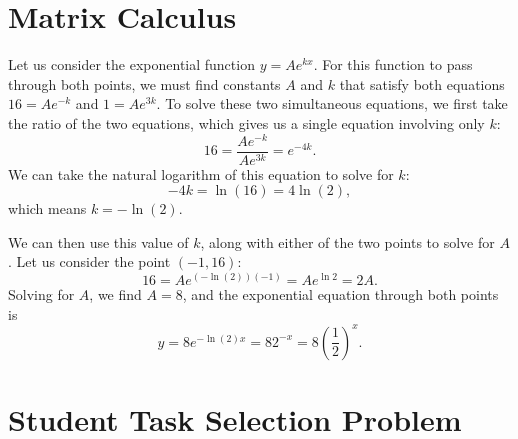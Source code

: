 \documentclass[9pt]{article}         %
\begin{document}
\section{Matrix Calculus}


Let us consider the exponential function $y = A e^{k x}$.  For this function
to pass through both points, we must find constants $A$ and $k$ that satisfy
both equations $16 = A e^{-k}$ and $1 = A e^{3 k}$.  To solve these two
simultaneous equations, we first take the ratio of the two equations, which
gives us a single equation involving only $k$:
$$
	16
	= \frac{A e^{-k}}{A e^{3 k}}
	= e^{-4 k}
	.
$$
We can take the natural logarithm of this equation to solve for $k$:
$$
	-4k = \ln(16) = 4 \ln (2)
	,
$$
which means $k = - \ln(2)$.

We can then use this value of $k$, along with either of the two points to
solve for $A$.  Let us consider the point $(-1, 16)$:
$$
	16 = A e^{(-\ln(2))(-1)} = A e^{\ln{2}} = 2 A
	.
$$
Solving for $A$, we find $A = 8$, and the exponential equation through both
points is
$$
	y
	= 8 e^{-\ln(2) x}
	= 8 2^{-x}
	= 8 \left( \frac{1}{2} \right)^x
	.
$$

\section{Student Task Selection Problem}
\end{document}
